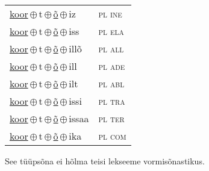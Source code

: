 \begin{minipage}{\textwidth}
\begin{sideways}
\begin{tabular}{l l}
\underline{koor}\,$\oplus$\,t\,$\oplus$\,\underline{õ}\,$\oplus$\,iz & \textsc{ pl ine } \\
\underline{koor}\,$\oplus$\,t\,$\oplus$\,\underline{õ}\,$\oplus$\,iss & \textsc{ pl ela } \\
\underline{koor}\,$\oplus$\,t\,$\oplus$\,\underline{õ}\,$\oplus$\,illõ & \textsc{ pl all } \\
\underline{koor}\,$\oplus$\,t\,$\oplus$\,\underline{õ}\,$\oplus$\,ill & \textsc{ pl ade } \\
\underline{koor}\,$\oplus$\,t\,$\oplus$\,\underline{õ}\,$\oplus$\,ilt & \textsc{ pl abl } \\
\underline{koor}\,$\oplus$\,t\,$\oplus$\,\underline{õ}\,$\oplus$\,issi & \textsc{ pl tra } \\
\underline{koor}\,$\oplus$\,t\,$\oplus$\,\underline{õ}\,$\oplus$\,issaa & \textsc{ pl ter } \\
\underline{koor}\,$\oplus$\,t\,$\oplus$\,\underline{õ}\,$\oplus$\,ika & \textsc{ pl com } \\
\end{tabular}
\end{sideways}
\label{tab:tüüpsõnamall-koorrõ}

\end{minipage}

 
\vspace{1em}
\noindent See tüüpsõna ei hõlma teisi lekseeme vormi\-sõnastikus.
